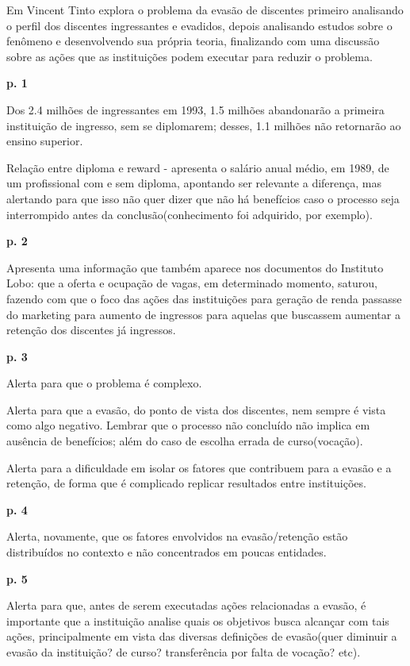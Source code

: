 \documentclass{report}
\begin{document}
Em \cite{tinto_leaving} Vincent Tinto explora o problema da evasão de discentes primeiro analisando o perfil dos discentes ingressantes e evadidos, depois analisando estudos sobre o fenômeno e desenvolvendo sua própria teoria, finalizando com uma discussão sobre as ações que as instituições podem executar para reduzir o problema.

\textbf{p. 1}

Dos 2.4 milhões de ingressantes em 1993, 1.5 milhões abandonarão a primeira instituição de ingresso, sem se diplomarem; desses, 1.1 milhões não retornarão ao ensino superior.

Relação entre diploma e reward - apresenta o salário anual médio, em 1989, de um profissional com e sem diploma, apontando ser relevante a diferença, mas alertando para que isso não quer dizer que não há benefícios caso o processo seja interrompido antes da conclusão(conhecimento foi adquirido, por exemplo).

\textbf{p. 2}

Apresenta uma informação que também aparece nos documentos do Instituto Lobo: que a oferta e ocupação de vagas, em determinado momento, saturou, fazendo com que o foco das ações das instituições para geração de renda passasse do marketing para aumento de ingressos para aquelas que buscassem aumentar a retenção dos discentes já ingressos.

\textbf{p. 3}

Alerta para que o problema é complexo.

Alerta para que a evasão, do ponto de vista dos discentes, nem sempre é vista como algo negativo. Lembrar que o processo não concluído não implica em ausência de benefícios; além do caso de escolha errada de curso(vocação).

Alerta para a dificuldade em isolar os fatores que contribuem para a evasão e a retenção, de forma que é complicado replicar resultados entre instituições.

\textbf{p. 4}

Alerta, novamente, que os fatores envolvidos na evasão/retenção estão distribuídos no contexto e não concentrados em poucas entidades.

\textbf{p. 5}

Alerta para que, antes de serem executadas ações relacionadas a evasão, é importante que a instituição analise quais os objetivos busca alcançar com tais ações, principalmente em vista das diversas definições de evasão(quer diminuir a evasão da instituição? de curso? transferência por falta de vocação? etc).
\end{document}
